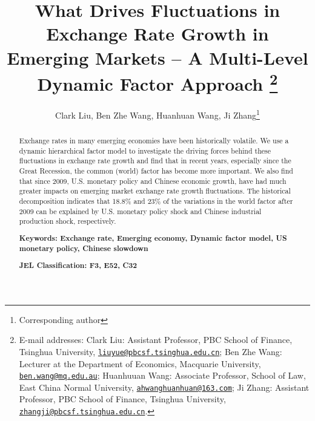 \documentclass[12pt]{article}
\numberwithin{equation}{section}
\begin{document}
\title{What Drives Fluctuations in Exchange Rate Growth in Emerging Markets -- A Multi-Level Dynamic Factor Approach
\thanks{%
 E-mail addresses: Clark Liu: Assistant Professor, PBC School of Finance, Tsinghua University,   \href{mailto:liuyue@pbcsf.tsinghua.edu.cn}{\nolinkurl{liuyue@pbcsf.tsinghua.edu.cn}};
 Ben Zhe Wang: Lecturer at the Department of Economics, Macquarie University, \href{mailto:ben.wang@mq.edu.au}{\nolinkurl{ben.wang@mq.edu.au}};
 Huanhuuan Wang: Associate Professor, School of Law, East China Normal University, \href{mailto:ahwanghuanhuan@163.com}{\nolinkurl{ahwanghuanhuan@163.com}};
 Ji Zhang: Assistant Professor, PBC School of Finance, Tsinghua University,  \href{mailto:zhangji@pbcsf.tsinghua.edu.cn}{\nolinkurl{zhangji@pbcsf.tsinghua.edu.cn}}. }
}
\author{Clark Liu, Ben Zhe Wang, Huanhuan Wang, Ji Zhang\footnote{Corresponding author}}





\date{}
\maketitle
\begin{abstract}
Exchange rates in many emerging economies have been historically volatile. We use a dynamic hierarchical factor model to investigate the driving forces behind these fluctuations in exchange rate growth and find that in recent years, especially since the Great Recession, the common (world) factor has become more important. We also find that since 2009, U.S. monetary policy and Chinese economic growth, have had much greater impacts on emerging market exchange rate growth fluctuations. The historical decomposition indicates that 18.8\% and 23\% of the variations in the world factor after 2009 can be explained by U.S. monetary policy shock and Chinese industrial production shock, respectively.

{\bf Keywords: Exchange rate, Emerging economy, Dynamic factor model, US monetary policy, Chinese slowdown}

{\bf JEL Classification: F3, E52, C32}
\end{abstract}
\end{document}
